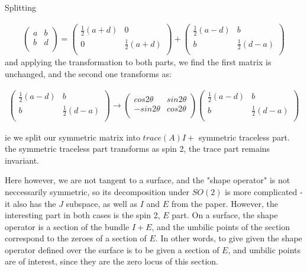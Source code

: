 \documentclass[11pt,onecolumn, a4page]{article}
\numberwithin{equation}{subsection}
\begin{document}
Splitting 

\begin{eqnarray}
\begin{pmatrix} 
 a & b\\
  b & d \\
 \end{pmatrix} 
=
 \begin{pmatrix} 
 \frac{1}{2}(a+d) & 0\\
  0 & \frac{1}{2}(a+d) \\
 \end{pmatrix}
 +
  \begin{pmatrix} 
 \frac{1}{2}(a-d) & b\\
  b & \frac{1}{2}(d-a) \\
 \end{pmatrix}
\end{eqnarray}
and applying the transformation to both parts, we find the first matrix is unchanged, and the second one transforms as:

\begin{eqnarray}
  \begin{pmatrix} 
 \frac{1}{2}(a-d) & b\\
  b & \frac{1}{2}(d-a) \\
 \end{pmatrix}
 \rightarrow  
 \begin{pmatrix} 
 cos 2\theta & sin 2\theta \\
  -sin 2\theta & cos 2\theta \\
 \end{pmatrix}
   \begin{pmatrix} 
 \frac{1}{2}(a-d) & b\\
  b & \frac{1}{2}(d-a) \\
 \end{pmatrix}
\end{eqnarray}

ie we split our symmetric matrix into  $trace(A)I +$ symmetric traceless part. the symmetric traceless part transforms as spin 2, the trace part remains invariant.

Here however, we are not tangent to a surface, and the "shape operator" is not neccessarily symmetric, so its decomposition under $SO(2)$ is more complicated - it also has the $J$ subspace, as well as $I$ and $E$ from the paper. However, the interesting part in both cases is the spin 2, $E$ part. On a surface, the shape operator is a section of the bundle $I +E$, and the umbilic points of the section correspond to the zeroes of a section of $E$. In other words, to give given the shape operator defined over the surface is to be given a section of $E$, and umbilic points are of interest, since they are the zero locus of this section. 
\end{document}
